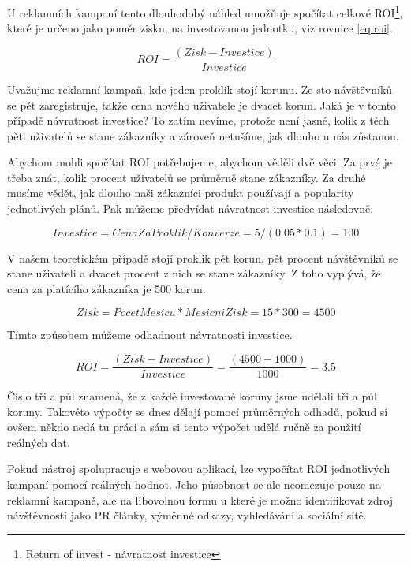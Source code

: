 \documentclass[bc,male,java,dept456]{diploma}						%
\begin{document}
U reklamních kampaní tento dlouhodobý náhled umožňuje spočítat celkové ROI\footnote{Return of invest - návratnost investice}, které je určeno jako poměr zisku, na investovanou jednotku, viz rovnice \ref{eq:roi}.

\begin{equation}\label{eq:roi}
ROI = \frac{(Zisk - Investice)}{Investice}
\end{equation}

Uvažujme reklamní kampaň, kde jeden proklik stojí korunu. Ze sto návštěvníků se pět zaregistruje, takže cena nového uživatele je dvacet korun. Jaká je v tomto případě návratnost investice? To zatím nevíme, protože není jasné, kolik z těch pěti uživatelů se stane zákazníky a zároveň netušíme, jak dlouho u nás zůstanou.

Abychom mohli spočítat ROI potřebujeme, abychom věděli dvě věci. Za prvé je třeba znát, kolik procent uživatelů se průměrně stane zákazníky. Za druhé musíme vědět, jak dlouho naši zákazníci produkt používají a popularity jednotlivých plánů. Pak můžeme předvídat návratnost investice následovně:


\begin{equation}\label{eq:roi2}
Investice = CenaZaProklik / Konverze = 5 / (0.05 * 0.1) = 100
\end{equation}

V našem teoretickém případě stojí proklik pět korun, pět procent návštěvníků se stane uživateli a dvacet procent z nich se stane zákazníky. Z toho vyplývá, že cena za platícího zákazníka je 500 korun.


\begin{equation}\label{eq:roi3}
Zisk = PocetMesicu * MesicniZisk = 15 * 300 = 4500
\end{equation}

Tímto způsobem můžeme odhadnout návratnosti investice.

\begin{equation}\label{eq:roi4}
ROI = \frac{(Zisk - Investice)}{Investice} = \frac{(4500 - 1000)}{1000} = 3.5
\end{equation}

Číslo tři a půl znamená, že z každé investované koruny jsme udělali tři a půl koruny. Takovéto výpočty se dnes dělají pomocí průměrných odhadů, pokud si ovšem někdo nedá tu práci a sám si tento výpočet udělá ručně za použití reálných dat.

Pokud nástroj spolupracuje s webovou aplikací, lze vypočítat ROI jednotlivých kampaní pomocí reálných hodnot. Jeho působnost se ale neomezuje pouze na reklamní kampaně, ale na libovolnou formu u které je možno identifikovat zdroj návštěvnosti jako PR články, výměnné odkazy, vyhledávání a sociální sítě.
\end{document}

